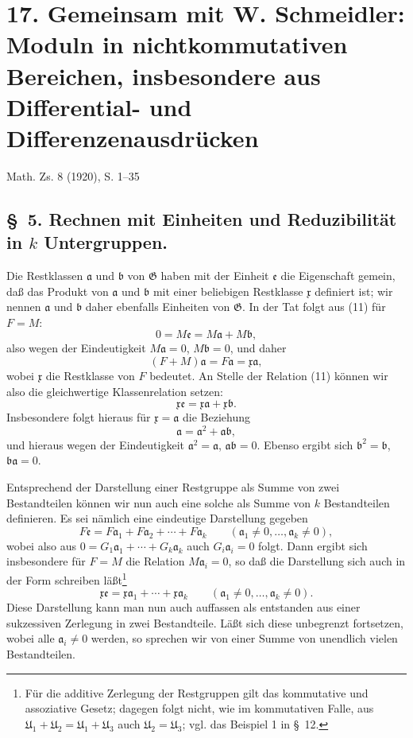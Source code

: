 \documentclass[11pt]{article}
\newcommand{\mG}{\mathfrak{G}}
\newcommand{\ma}{\mathfrak{a}}
\newcommand{\mb}{\mathfrak{b}}
\newcommand{\mx}{\mathfrak{x}}
\newcommand{\me}{\mathfrak{e}}
\providecommand{\mU}{\mathfrak{U}}
\begin{document}
\clearpage
\setcounter{footnote}{0}
\section*{17. Gemeinsam mit W. Schmeidler: Moduln in nichtkommutativen Bereichen, insbesondere aus Differential- und Differenzenausdrücken}
\begin{center}
Math. Zs. 8 (1920), S. 1--35
\end{center}

\subsection*{\S~5. Rechnen mit Einheiten und Reduzibilität in $k$ Untergruppen.}

Die Restklassen $\ma$ und $\mb$ von $\mG$ haben mit der Einheit $\me$ die Eigenschaft gemein, daß das Produkt von $\ma$ und $\mb$ mit einer beliebigen Restklasse $\mx$ definiert ist; wir nennen $\ma$ und $\mb$ daher ebenfalls Einheiten von $\mG$. In der Tat folgt aus (11) für $F=M$:
\[
 0=M\me=M\ma+M\mb,
\]
also wegen der Eindeutigkeit $M\ma=0$, $M\mb=0$, und daher
\[
 (F+M)\ma=F\ma=\mx\ma,
\]
wobei $\mx$ die Restklasse von $F$ bedeutet. An Stelle der Relation (11) können wir also die gleichwertige Klassenrelation setzen:
\[
 \mx\me=\mx\ma+\mx\mb.
\]
Insbesondere folgt hieraus für $\mx=\ma$ die Beziehung
\[
 \ma=\ma^2+\ma\mb,
\]
und hieraus wegen der Eindeutigkeit $\ma^2=\ma$, $\ma\mb=0$. Ebenso ergibt sich $\mb^2=\mb$, $\mb\ma=0$.

Entsprechend der Darstellung einer Restgruppe als Summe von zwei Bestandteilen können wir nun auch eine solche als Summe von $k$ Bestandteilen definieren. Es sei nämlich eine eindeutige Darstellung gegeben
\[
 F\me=F\ma_1+F\ma_2+\cdots+F\ma_k\qquad(\ma_1\ne0,\ldots,\ma_k\ne0),
\]
wobei also aus $0=G_1\ma_1+\cdots+G_k\ma_k$ auch $G_i\ma_i=0$ folgt. Dann ergibt sich insbesondere für $F=M$ die Relation $M\ma_i=0$, so daß die Darstellung sich auch in der Form schreiben läßt\footnote{Für die additive Zerlegung der Restgruppen gilt das kommutative und assoziative Gesetz; dagegen folgt nicht, wie im kommutativen Falle, aus $\mU_1+\mU_2=\mU_1+\mU_3$ auch $\mU_2=\mU_3$; vgl. das Beispiel 1 in \S~12.}
\begin{equation}
 \mx\me=\mx\ma_1+\cdots+\mx\ma_k\qquad(\ma_1\ne0,\ldots,\ma_k\ne0).
\tag{12}
\end{equation}
Diese Darstellung kann man nun auch auffassen als entstanden aus einer sukzessiven Zerlegung in zwei Bestandteile. Läßt sich diese unbegrenzt fortsetzen, wobei alle $\ma_i\ne0$ werden, so sprechen wir von einer Summe von unendlich vielen Bestandteilen.
\end{document}
